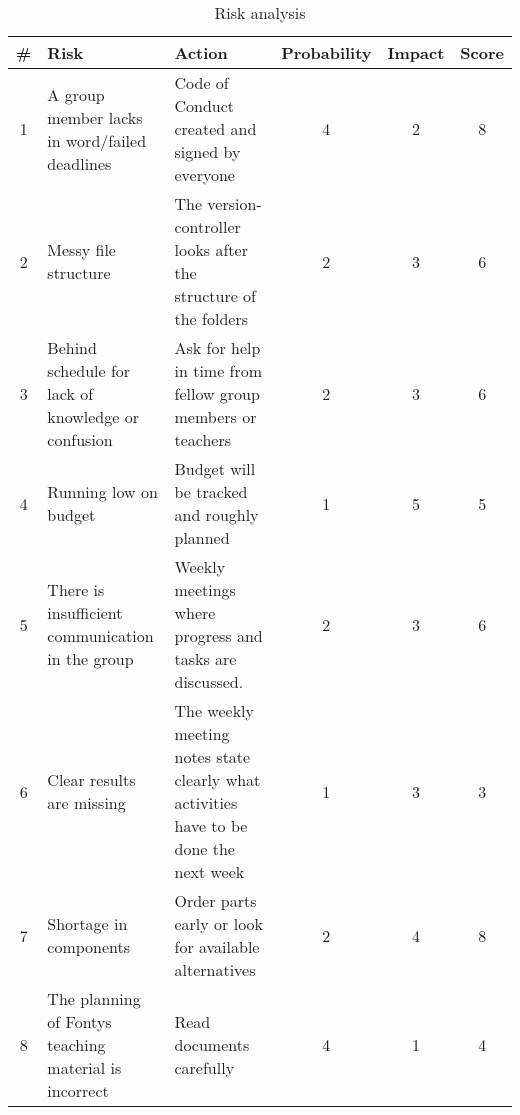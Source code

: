\renewcommand\tabularxcolumn[1]{m{#1}}%

\begin{table}[!h]
	\begin{tabularx}{\textwidth}{|c|X|X|c|c|c|} \hline
		\# 	& Risk 													& Action 																				& Probability 	& Impact 	& Score 	\\ \hline
		1 	& A group member lacks in word/failed deadlines			& Code of Conduct created and signed by everyone										& 4	& 2			& \cellcolor{yellow}8	\\ \hline
		2 	& Messy file structure									& The version-controller looks after the structure of the folders						& 2	& 3			& \cellcolor{yellow}6	\\ \hline
		3 	& Behind schedule for lack of knowledge or confusion	& Ask for help in time from fellow group members or teachers							& 2	& 3			& \cellcolor{yellow}6	\\ \hline
		4 	& Running low on budget									& Budget will be tracked and roughly planned											& 1	& 5			& \cellcolor{yellow}5	\\ \hline
		5 	& There is insufficient communication in the group		& Weekly meetings where progress and tasks are discussed.								& 2	& 3			& \cellcolor{yellow}6	\\ \hline
		6 	& Clear results are missing								& The weekly meeting notes state clearly what activities have to be done the next week	& 1	& 3			& \cellcolor{green}3	\\ \hline
		7 	& Shortage in components								& Order parts early or look for available alternatives									& 2	& 4			& \cellcolor{yellow}8	\\ \hline
		8 	& The planning of Fontys teaching material is incorrect	& Read documents carefully																& 4	& 1			& \cellcolor{green}4	\\ \hline
	\end{tabularx}
	\caption{Risk analysis}
\end{table}